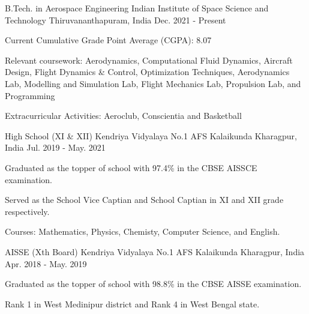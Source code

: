 

\begin{cventries}

  \cventry
  {B.Tech. in Aerospace Engineering} %
  {Indian Institute of Space Science and Technology} %
  {Thiruvananthapuram, India} %
  {Dec. 2021 - Present} %
  {
    \begin{cvitems} %
      \item {Current Cumulative Grade Point Average (CGPA): 8.07}
      \item {Relevant coursework: Aerodynamics, Computational Fluid Dynamics, Aircraft Design, Flight Dynamics \& Control, Optimization Techniques, Aerodynamics Lab, Modelling and Simulation Lab, Flight Mechanics Lab, Propulsion Lab, and Programming}
      \item {Extracurricular Activities: Aeroclub, Conscientia and Basketball}
    \end{cvitems}
  }

  \cventry
  {High School (XI \& XII)} %
  {Kendriya Vidyalaya No.1 AFS Kalaikunda} %
  {Kharagpur, India} %
  {Jul. 2019 - May. 2021} %
  {
    \begin{cvitems} %
      \item {Graduated as the topper of school with 97.4\% in the CBSE AISSCE examination.}
      \item {Served as the School Vice Captian and School Captian in XI and XII grade respectively.}
      \item {Courses: Mathematics, Physics, Chemisty, Computer Science, and English.}
    \end{cvitems}
  }

  \cventry
  {AISSE (Xth Board)} %
  {Kendriya Vidyalaya No.1 AFS Kalaikunda} %
  {Kharagpur, India} %
  {Apr. 2018 - May. 2019} %
  {
    \begin{cvitems} %
      \item {Graduated as the topper of school with 98.8\% in the CBSE AISSE examination.}
      \item {Rank 1 in West Medinipur district and Rank 4 in West Bengal state.}
    \end{cvitems}
  }

\end{cventries}
